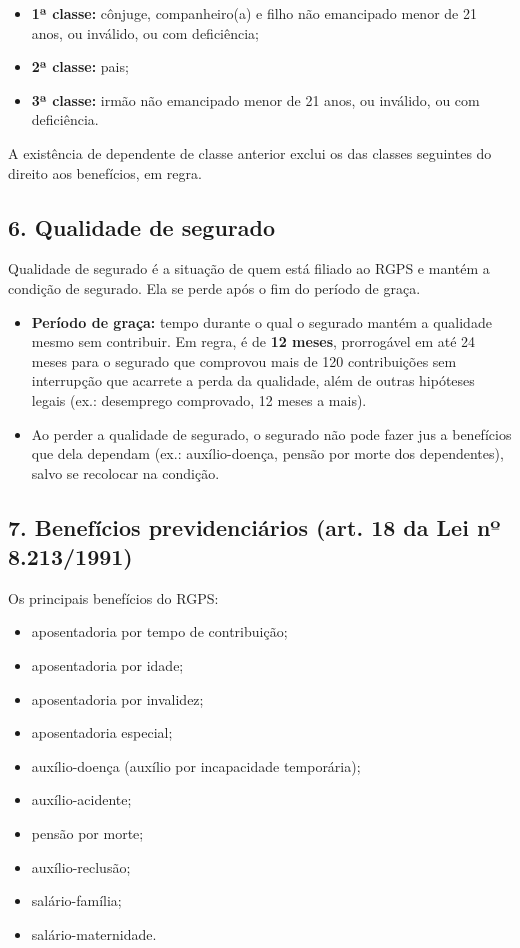 \documentclass[11pt,a4paper]{article}
\begin{document}
\begin{itemize}
  \item \textbf{1ª classe:} cônjuge, companheiro(a) e filho não emancipado menor de 21 anos, ou inválido, ou com deficiência;
  \item \textbf{2ª classe:} pais;
  \item \textbf{3ª classe:} irmão não emancipado menor de 21 anos, ou inválido, ou com deficiência.
\end{itemize}

A existência de dependente de classe anterior exclui os das classes seguintes do direito aos benefícios, em regra.

\subsection*{6. Qualidade de segurado}

Qualidade de segurado é a situação de quem está filiado ao RGPS e mantém a condição de segurado. Ela se perde após o fim do período de graça.

\begin{itemize}
  \item \textbf{Período de graça:} tempo durante o qual o segurado mantém a qualidade mesmo sem contribuir. Em regra, é de \textbf{12 meses}, prorrogável em até 24 meses para o segurado que comprovou mais de 120 contribuições sem interrupção que acarrete a perda da qualidade, além de outras hipóteses legais (ex.: desemprego comprovado, 12 meses a mais).
  \item Ao perder a qualidade de segurado, o segurado não pode fazer jus a benefícios que dela dependam (ex.: auxílio-doença, pensão por morte dos dependentes), salvo se recolocar na condição.
\end{itemize}

\subsection*{7. Benefícios previdenciários (art. 18 da Lei nº 8.213/1991)}

Os principais benefícios do RGPS:

\begin{itemize}
  \item aposentadoria por tempo de contribuição;
  \item aposentadoria por idade;
  \item aposentadoria por invalidez;
  \item aposentadoria especial;
  \item auxílio-doença (auxílio por incapacidade temporária);
  \item auxílio-acidente;
  \item pensão por morte;
  \item auxílio-reclusão;
  \item salário-família;
  \item salário-maternidade.
\end{itemize}
\end{document}
